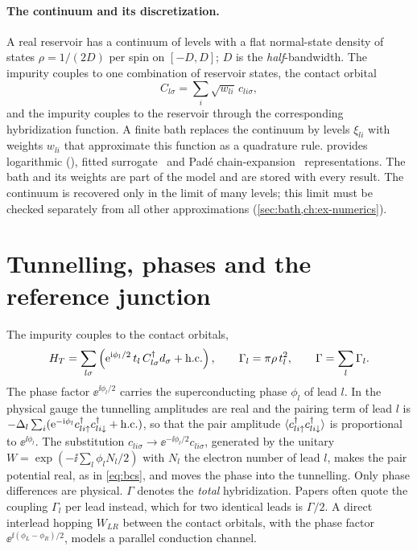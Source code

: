 \paragraph{The continuum and its discretization.}
A real reservoir has a continuum of levels with a flat normal-state density of states
$\rho=1/(2D)$ per spin on $[-D,D]$; $D$ is the \emph{half}-bandwidth. The impurity
couples to one combination of reservoir states, the contact orbital
\begin{equation}\label{eq:contact}
  C_{l\sigma}=\sum_i\sqrt{w_{li}}\,c_{li\sigma},
\end{equation}
and the impurity couples to the reservoir through the corresponding hybridization function. A finite bath
replaces the continuum by levels $\xi_{li}$ with weights $w_{li}$ that approximate this
function as a quadrature rule. \pkg{} provides logarithmic (), fitted
surrogate~\cite{baran2023surrogate} and Pad\'e chain-expansion~\cite{bobok2025scalable}
representations. The bath and its weights are part of the model and are stored with every
result. The continuum is recovered only in the limit of many levels; this limit must be
checked separately from all other approximations (\cref{sec:bath,ch:ex-numerics}).

\section{Tunnelling, phases and the reference junction}\label{sec:tunnelling}

The impurity couples to the contact orbitals,
\begin{equation}\label{eq:tunnelling}
  H_T=\sum_{l\sigma}\left(\mathrm{e}^{\mathrm{i}\phi_l/2}\,t_l\,C_{l\sigma}^\dagger d_\sigma+\mathrm{h.c.}\right),
  \qquad \Gamma_l=\pi\rho\,t_l^2,\qquad \Gamma=\sum_l\Gamma_l .
\end{equation}
The phase factor $\ee^{\ii\phi_l/2}$ carries the superconducting phase $\phi_l$ of lead $l$.
In the physical gauge the tunnelling amplitudes are real and the pairing term of lead $l$
is $-\Delta_l\sum_i(\mathrm{e}^{-\mathrm{i}\phi_l}c_{li{\uparrow}}^\dagger c_{li{\downarrow}}^\dagger+\mathrm{h.c.})$, so that the
pair amplitude $\langle c_{li{\uparrow}}^\dagger c_{li{\downarrow}}^\dagger\rangle$ is proportional to
$\ee^{\ii\phi_l}$. The substitution $c_{li\sigma}\to\ee^{-\ii\phi_l/2}c_{li\sigma}$, generated
by the unitary $W=\exp(-\ii\sum_l\phi_lN_l/2)$ with $N_l$ the electron number of lead $l$,
makes the pair potential real, as in \eqref{eq:bcs}, and moves the phase into the
tunnelling. Only phase differences are physical. $\Gamma$ denotes the \emph{total} hybridization. Papers
often quote the coupling $\Gamma_l$ per lead instead, which for two identical leads is
$\Gamma/2$. A direct interlead hopping $W_{LR}$ between the contact orbitals, with the phase
factor $\ee^{\ii(\phi_L-\phi_R)/2}$, models a parallel conduction channel.

